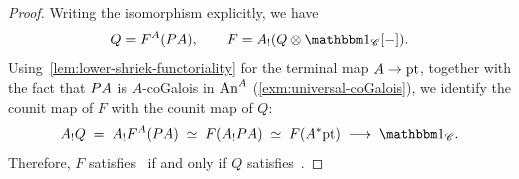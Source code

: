 \documentclass[english,svgnames,table]{article}
\begin{document}
    \begin{proof}
        Writing the isomorphism explicitly, we have
        \begin{equation*}
            Q = F^A(\Path A), \qquad F = A_!(Q \otimes \ounit_{\cC}[-]).
        \end{equation*}
        Using~\cref{lem:lower-shriek-functoriality} for the terminal map $A \to \mathrm{pt}$, together with the fact that $P A$ is $A$-coGalois in $\mathrm{An}^A$ (\cref{exm:universal-coGalois}), we identify the counit map of $F$ with the counit map of $Q$:
        \begin{equation*}
            A_! Q \;=\; A_! F^A(\Path A) \;\simeq\; F(A_! \Path A) \;\simeq\; F(A^* \pt) \;\too\; \ounit_{\cC}.
        \end{equation*}
        Therefore, $F$ satisfies~ if and only if $Q$ satisfies~.


\end{proof}
\end{document}
